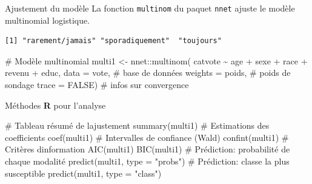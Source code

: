 \documentclass[
  ignorenonframetext,
]{beamer}
\newenvironment{Shaded}{\begin{snugshade}}{\end{snugshade}}
\newcommand{\AttributeTok}[1]{\textcolor[rgb]{0.40,0.45,0.13}{#1}}
\newcommand{\CommentTok}[1]{\textcolor[rgb]{0.37,0.37,0.37}{#1}}
\newcommand{\ConstantTok}[1]{\textcolor[rgb]{0.56,0.35,0.01}{#1}}
\newcommand{\FunctionTok}[1]{\textcolor[rgb]{0.28,0.35,0.67}{#1}}
\newcommand{\NormalTok}[1]{\textcolor[rgb]{0.00,0.23,0.31}{#1}}
\newcommand{\OtherTok}[1]{\textcolor[rgb]{0.00,0.23,0.31}{#1}}
\newcommand{\SpecialCharTok}[1]{\textcolor[rgb]{0.37,0.37,0.37}{#1}}
\newcommand{\StringTok}[1]{\textcolor[rgb]{0.13,0.47,0.30}{#1}}
\begin{document}
\begin{frame}[fragile]{Ajustement du modèle}
\protect\hypertarget{ajustement-du-moduxe8le}{}
La fonction \texttt{multinom} du paquet \texttt{nnet} ajuste le modèle
multinomial logistique.

\begin{Shaded}
\end{Shaded}

\begin{verbatim}
[1] "rarement/jamais" "sporadiquement"  "toujours"       
\end{verbatim}

\begin{Shaded}
\begin{Highlighting}[numbers=left,,]
\CommentTok{\# Modèle multinomial}
\NormalTok{multi1 }\OtherTok{\textless{}{-}}\NormalTok{ nnet}\SpecialCharTok{::}\FunctionTok{multinom}\NormalTok{(}
\NormalTok{  catvote }\SpecialCharTok{\textasciitilde{}}\NormalTok{ age }\SpecialCharTok{+}\NormalTok{ sexe }\SpecialCharTok{+}\NormalTok{ race }\SpecialCharTok{+}\NormalTok{ revenu }\SpecialCharTok{+}\NormalTok{ educ, }
  \AttributeTok{data =}\NormalTok{ vote,     }\CommentTok{\# base de données}
  \AttributeTok{weights =}\NormalTok{ poids, }\CommentTok{\# poids de sondage}
  \AttributeTok{trace =} \ConstantTok{FALSE}\NormalTok{)   }\CommentTok{\# infos sur convergence}
\end{Highlighting}
\end{Shaded}
\end{frame}

\begin{frame}[fragile]{Méthodes \textbf{R} pour l'analyse}
\protect\hypertarget{muxe9thodes-r-pour-lanalyse}{}
\begin{Shaded}
\begin{Highlighting}[numbers=left,,]
\CommentTok{\# Tableau résumé de l\textquotesingle{}ajustement}
\FunctionTok{summary}\NormalTok{(multi1)}
\CommentTok{\# Estimations des coefficients}
\FunctionTok{coef}\NormalTok{(multi1)}
\CommentTok{\# Intervalles de confiance (Wald)}
\FunctionTok{confint}\NormalTok{(multi1)}
\CommentTok{\# Critères d\textquotesingle{}information}
\FunctionTok{AIC}\NormalTok{(multi1)}
\FunctionTok{BIC}\NormalTok{(multi1)}
\CommentTok{\# Prédiction: probabilité de chaque modalité}
\FunctionTok{predict}\NormalTok{(multi1, }\AttributeTok{type =} \StringTok{"probs"}\NormalTok{)}
\CommentTok{\# Prédiction: classe la plus susceptible}
\FunctionTok{predict}\NormalTok{(multi1, }\AttributeTok{type =} \StringTok{"class"}\NormalTok{)}
\end{Highlighting}
\end{Shaded}
\end{frame}
\end{document}
